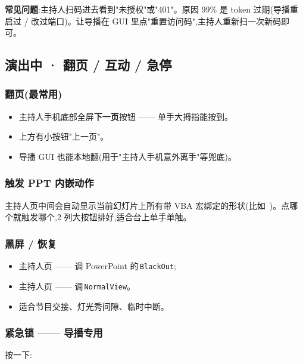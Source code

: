 \begin{infobox}
\textbf{常见问题}:主持人扫码进去看到"未授权"或"401"。原因 99\% 是 token 过期(导播重启过 / 改过端口)。让导播在 GUI 里点"重置访问码",主持人重新扫一次新码即可。
\end{infobox}

\subsection{演出中 · 翻页 / 互动 / 急停}

\subsubsection*{翻页(最常用)}

\begin{itemize}
  \item 主持人手机底部全屏\textbf{下一页}按钮 —— 单手大拇指能按到。
  \item 上方有小按钮"上一页"。
  \item 导播 GUI 也能本地翻(用于"主持人手机意外离手"等兜底)。
\end{itemize}

\subsubsection*{触发 PPT 内嵌动作}

主持人页中间会自动显示当前幻灯片上所有带 VBA 宏绑定的形状(比如\,\,\,)。点哪个就触发哪个,2 列大按钮排好,适合台上单手单触。

\subsubsection*{黑屏 / 恢复}

\begin{itemize}
  \item 主持人页\,\,—— 调 PowerPoint 的\,\texttt{BlackOut};
  \item 主持人页\,\,—— 调\,\texttt{NormalView}。
  \item 适合节目交接、灯光秀间隙、临时中断。
\end{itemize}

\subsubsection*{紧急锁 —— 导播专用}

按一下:

